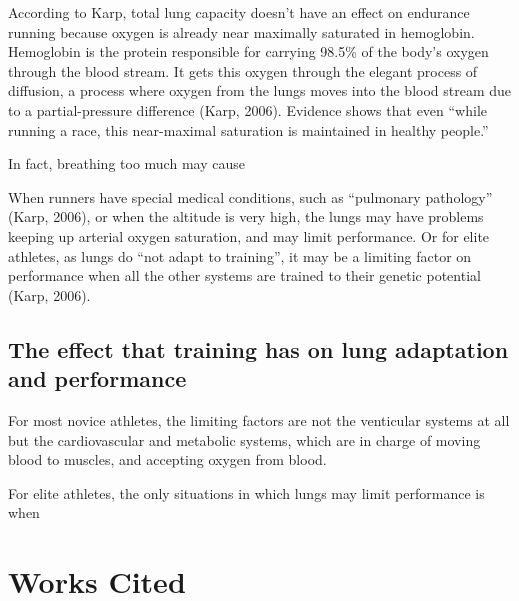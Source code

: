 \documentclass[index]{subfiles}
\begin{document}
According to Karp, total lung capacity doesn't have an effect on endurance running because oxygen is already near maximally saturated in hemoglobin. Hemoglobin is the protein responsible for carrying 98.5\% of the body's oxygen through the blood stream. It gets this oxygen through the elegant process of diffusion, a process where oxygen from the lungs moves into the blood stream due to a partial-pressure difference (Karp, 2006). Evidence shows that even ``while running a race, this near-maximal saturation is maintained in healthy people.''

In fact, breathing too much may cause

When runners have special medical conditions, such as ``pulmonary pathology'' (Karp, 2006), or when the altitude is very high, the lungs may have problems keeping up arterial oxygen saturation, and may limit performance.
Or for elite athletes, as lungs do ``not adapt to training'', it may be a limiting factor on performance when all the other systems are trained to their genetic potential (Karp, 2006). 




\subsection{The effect that training has on lung adaptation and performance}

For most novice athletes, the limiting factors are not the venticular systems at all but the cardiovascular and metabolic systems, which are in charge of moving blood to muscles, and accepting oxygen from blood.

For elite athletes, the only situations in which lungs may limit performance is when

\section{Works Cited}


\end{document}
